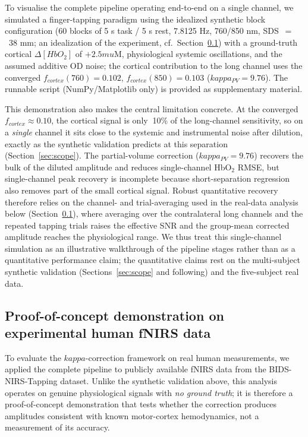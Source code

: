 \documentclass[11pt]{article}
\def\kappa{kappa}%
\def\mu{mu}%
\def\sim{~}%
\def\mathrm#1{#1}%
\def\,{ }%
\begin{document}
To visualise the complete pipeline operating end-to-end on a single channel, we simulated a finger-tapping paradigm using the idealized synthetic block configuration (60 blocks of 5\,s task / 5\,s rest, 7.8125\,Hz, 760/850\,nm, SDS~$=$~38\,mm; an idealization of the experiment, cf.\ Section~\ref{sec:realdata}) with a ground-truth cortical $\Delta[\mathrm{HbO}_2]$ of $+2.5\,\mu$M, physiological systemic oscillations, and the assumed additive OD noise; the cortical contribution to the long channel uses the converged $f_{\mathrm{cortex}}(760)=0.102$, $f_{\mathrm{cortex}}(850)=0.103$ ($\kappa_{\mathrm{PV}}=9.76$). The runnable script (NumPy/Matplotlib only) is provided as supplementary material.

This demonstration also makes the central limitation concrete. At the converged $f_{\mathrm{cortex}}\approx0.10$, the cortical signal is only $\sim$10\% of the long-channel sensitivity, so on a \emph{single} channel it sits close to the systemic and instrumental noise after dilution, exactly as the synthetic validation predicts at this separation (Section~\ref{sec:scope}). The partial-volume correction ($\kappa_{\mathrm{PV}}=9.76$) recovers the bulk of the diluted amplitude and reduces single-channel HbO$_2$ RMSE, but single-channel peak recovery is incomplete because short-separation regression also removes part of the small cortical signal. Robust quantitative recovery therefore relies on the channel- and trial-averaging used in the real-data analysis below (Section~\ref{sec:realdata}), where averaging over the contralateral long channels and the repeated tapping trials raises the effective SNR and the group-mean corrected amplitude reaches the physiological range. We thus treat this single-channel simulation as an illustrative walkthrough of the pipeline stages rather than as a quantitative performance claim; the quantitative claims rest on the multi-subject synthetic validation (Sections~\ref{sec:scope} and following) and the five-subject real data.

\subsection{Proof-of-concept demonstration on experimental human fNIRS data}
\label{sec:realdata}

To evaluate the $\kappa$-correction framework on real human measurements, we applied the complete pipeline to publicly available fNIRS data from the BIDS-NIRS-Tapping dataset\cite{r36}. Unlike the synthetic validation above, this analysis operates on genuine physiological signals with \emph{no ground truth}; it is therefore a proof-of-concept demonstration that tests whether the correction produces amplitudes consistent with known motor-cortex hemodynamics, not a measurement of its accuracy.
\end{document}
